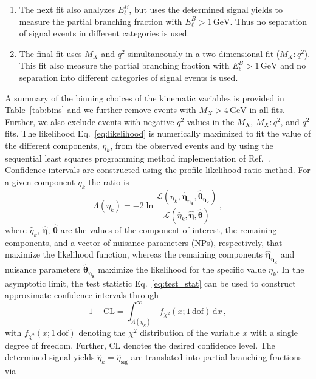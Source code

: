 \documentclass[twocolumn,aps,prd,superscriptaddress,nofootinbib,floatfix,preprintnumbers,a4]{revtex4-1}
\begin{document}
\begin{enumerate}
  \item The next fit also analyzes $E_\ell^B$, but uses the determined signal yields to measure the partial branching fraction with $E_\ell^B > 1 \, \text{GeV}$. Thus no separation of signal events in different categories is used. 
 \item The final fit uses $M_X$ and $q^2$ simultaneously in a two dimensional fit ($M_X:q^2$). This fit also measure the partial branching fraction with $E_\ell^B > 1 \, \text{GeV}$ and no separation into different categories of signal events is used. 
 \end{enumerate}
A summary of the binning choices of the kinematic variables is provided in Table~\ref{tab:bins} and we further remove events with $M_X > 4 \, \mathrm{GeV}$ in all fits. Further, we also exclude events with negative $q^2$ values in the $M_X$, $M_X:q^2$, and $q^2$ fits. The likelihood Eq.~\ref{eq:likelihood} is numerically maximized to fit the value of the different components, $\eta_k$, from the observed events and by using the sequential least squares programming method implementation of Ref.~\cite{iminuit}. Confidence intervals are constructed using the profile likelihood ratio method. For a given component $\eta_k$ the ratio is
\begin{equation} \label{eq:test_stat}
  \Lambda(\eta_k) =  - 2 \ln \frac{ \mathcal{L}( \eta_k, \boldsymbol{\widehat \eta_{\eta_k}}, \boldsymbol{\widehat \theta_{\eta_k}}  ) }{  \mathcal{L}( \widehat  \eta_k,  \boldsymbol{ \widehat \eta}, \boldsymbol{ \widehat \theta}  )  } \, ,
\end{equation}
where $ \widehat  \eta_k$, $\boldsymbol{\widehat \eta}$, $\boldsymbol{ \widehat \theta} $ are the values of the component of interest, the remaining components, and a vector of nuisance parameters (NPs), respectively, that maximize the likelihood function, whereas the remaining components $\boldsymbol{\widehat \eta_{\eta_k}}$ and nuisance parameters $\boldsymbol{\widehat \theta_{\eta_k}} $ maximize the likelihood for the specific value $\eta_k$. In the asymptotic limit, the test statistic Eq.~\ref{eq:test_stat} can be used to construct approximate confidence intervals through
\begin{equation}
  1 - \text{CL} = \int_{ \Lambda(\eta_k) }^{\infty} \, f_{\chi^2}(x; 1 \, \text{dof}) \, \text{d} x \, ,
\end{equation}
with $f_{\chi^2}(x; 1 \, \text{dof})$ denoting the $\chi^2$ distribution of the variable $x$ with a single degree of freedom. Further, CL denotes the desired confidence level. The determined signal yields $ \widehat  \eta_{k} =  \widehat  \eta_{\mathrm{sig}}$ are translated into partial branching fractions via
\end{document}

